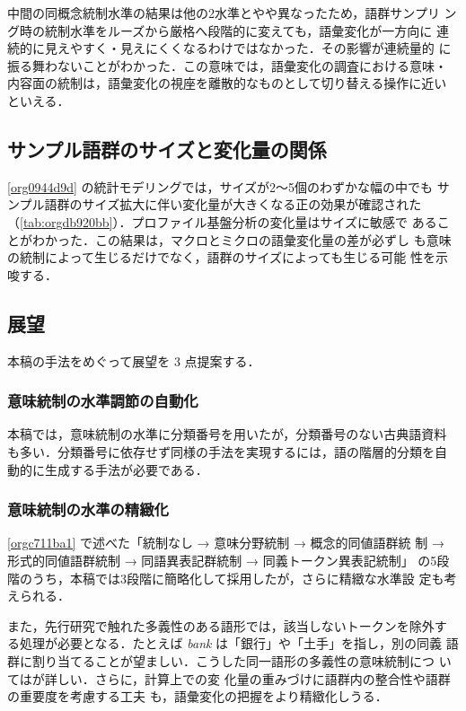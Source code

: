 \documentclass[submit]{ipsj}
\renewcommand{\ref}{\cref}
\begin{document}
中間の同概念統制水準の結果は他の2水準とやや異なったため，語群サンプリ
ング時の統制水準をルーズから厳格へ段階的に変えても，語彙変化が一方向に
連続的に見えやすく・見えにくくなるわけではなかった．その影響が連続量的
に振る舞わないことがわかった．この意味では，語彙変化の調査における意味・
内容面の統制は，語彙変化の視座を離散的なものとして切り替える操作に近い
といえる．
\subsection{サンプル語群のサイズと変化量の関係\label{orgfe05161}}
\label{sec:org4d8ce35}
\ref{org0944d9d} の統計モデリングでは，サイズが2〜5個のわずかな幅の中でも
サンプル語群のサイズ拡大に伴い変化量が大きくなる正の効果が確認された
（\ref{tab:orgdb920bb}）．プロファイル基盤分析の変化量はサイズに敏感で
あることがわかった．この結果は，マクロとミクロの語彙変化量の差が必ずし
も意味の統制によって生じるだけでなく，語群のサイズによっても生じる可能
性を示唆する．
\subsection{展望\label{org5e51272}}
\label{sec:org3b98a82}
本稿の手法をめぐって展望を 3 点提案する．
\subsubsection{意味統制の水準調節の自動化\label{org7c62a26}}
\label{sec:orga9e8ddd}
本稿では，意味統制の水準に分類番号を用いたが，分類番号のない古典語資料
も多い．分類番号に依存せず同様の手法を実現するには，語の階層的分類を自
動的に生成する手法が必要である．
\subsubsection{意味統制の水準の精緻化\label{orgf9d1cfd}}
\label{sec:org1c649d0}
\ref{orgc711ba1} で述べた「統制なし → 意味分野統制 → 概念的同値語群統
制 → 形式的同値語群統制 → 同語異表記群統制 → 同義トークン異表記統制」
の5段階のうち，本稿では3段階に簡略化して採用したが，さらに精緻な水準設
定も考えられる．

また，先行研究で触れた多義性のある語形では，該当しないトークンを除外す
る処理が必要となる．たとえば \emph{bank} は「銀行」や「土手」を指し，別の同義
語群に割り当てることが望ましい．こうした同一語形の多義性の意味統制につ
いては\cite{DePascale2021Scoring}が詳しい．さらに，計算上での変
化量の重みづけに語群内の整合性や語群の重要度を考慮する工夫
\cite{Ruette2014Semantic} も，語彙変化の把握をより精緻化しうる．
\end{document}
